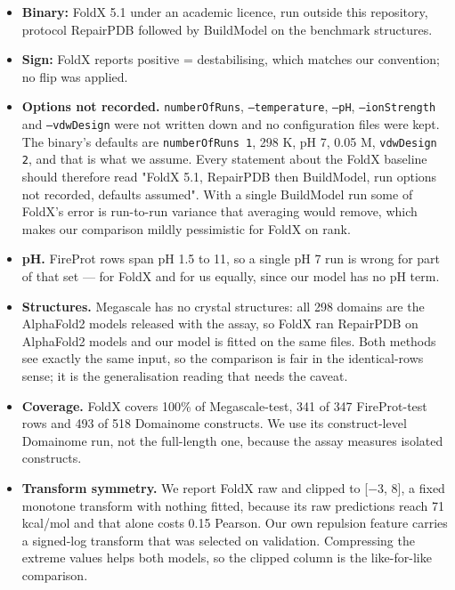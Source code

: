 \documentclass[11pt,a4paper]{article}
\begin{document}
\begin{itemize}
\item \textbf{Binary:} FoldX 5.1 under an academic licence, run outside this repository, protocol RepairPDB followed by
  BuildModel on the benchmark structures.
\item \textbf{Sign:} FoldX reports positive = destabilising, which matches our convention; no flip was applied.
\item \textbf{Options not recorded.} \texttt{numberOfRuns}, \texttt{--temperature}, \texttt{--pH}, \texttt{--ionStrength} and \texttt{--vdwDesign} were not
  written down and no configuration files were kept. The binary's defaults are \texttt{numberOfRuns 1}, 298 K, pH 7,
  0.05 M, \texttt{vdwDesign 2}, and that is what we assume. Every statement about the FoldX baseline should therefore
  read "FoldX 5.1, RepairPDB then BuildModel, run options not recorded, defaults assumed". With a single
  BuildModel run some of FoldX's error is run-to-run variance that averaging would remove, which makes our
  comparison mildly pessimistic for FoldX on rank.
\item \textbf{pH.} FireProt rows span pH 1.5 to 11, so a single pH 7 run is wrong for part of that set --- for FoldX and
  for us equally, since our model has no pH term.
\item \textbf{Structures.} Megascale has no crystal structures: all 298 domains are the AlphaFold2 models released with
  the assay, so FoldX ran RepairPDB on AlphaFold2 models and our model is fitted on the same files. Both methods
  see exactly the same input, so the comparison is fair in the identical-rows sense; it is the generalisation
  reading that needs the caveat.
\item \textbf{Coverage.} FoldX covers 100\% of Megascale-test, 341 of 347 FireProt-test rows and 493 of 518 Domainome
  constructs. We use its construct-level Domainome run, not the full-length one, because the assay measures
  isolated constructs.
\item \textbf{Transform symmetry.} We report FoldX raw and clipped to [$-$3, 8], a fixed monotone transform with nothing
  fitted, because its raw predictions reach 71 kcal/mol and that alone costs 0.15 Pearson. Our own repulsion
  feature carries a signed-log transform that was selected on validation. Compressing the extreme values helps both models, so
  the clipped column is the like-for-like comparison.
\end{itemize}
\end{document}
